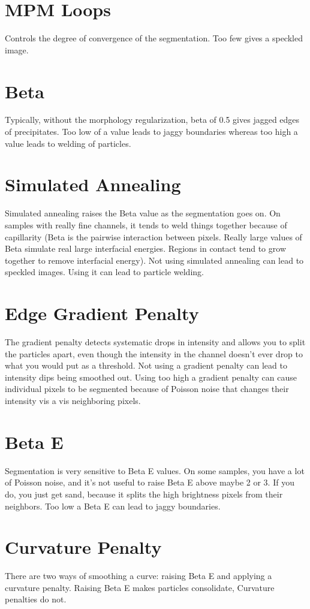 \documentclass[12pt,oneside]{book}
\begin{document}
\section{MPM Loops}
Controls the degree of convergence of the segmentation. Too few gives a speckled image.
\section{Beta}
Typically, without the morphology regularization, beta of 0.5 gives jagged edges of precipitates. Too low of a value leads to jaggy boundaries whereas too high a value leads to welding of particles.
\section{Simulated Annealing}
Simulated annealing raises the Beta value as the segmentation goes on. On samples with really fine channels, it tends to weld things together because of capillarity (Beta is the pairwise interaction between pixels. Really large values of Beta simulate real large interfacial energies. Regions in contact tend to grow together to remove interfacial energy). Not using simulated annealing can lead to speckled images. Using it can lead to particle welding.
\section{Edge Gradient Penalty}
The gradient penalty detects systematic drops in intensity and allows you to split the particles apart, even though the intensity in the channel doesn't ever drop to what you would put as a threshold. Not using a gradient penalty can lead to intensity dips being smoothed out. Using too high a gradient penalty can cause individual pixels to be segmented because of Poisson noise that changes their intensity vis a vis neighboring pixels.
\section{Beta E}
Segmentation is very sensitive to Beta E values. On some samples, you have a lot of Poisson noise, and it's not useful to raise Beta E above maybe 2 or 3. If you do, you just get sand, because it splits the high brightness pixels from their neighbors. Too low a Beta E can lead to jaggy boundaries.
\section{Curvature Penalty}
There are two ways of smoothing a curve: raising Beta E and applying a curvature penalty. Raising Beta E makes particles consolidate, Curvature penalties do not.
\end{document}
